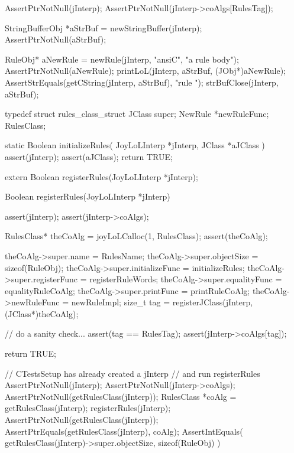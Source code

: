 \startCTest
  AssertPtrNotNull(jInterp);
  AssertPtrNotNull(jInterp->coAlgs[RulesTag]);

  StringBufferObj *aStrBuf = newStringBuffer(jInterp);
  AssertPtrNotNull(aStrBuf);
  
  RuleObj* aNewRule =
    newRule(jInterp, "ansiC", "a rule body");
  AssertPtrNotNull(aNewRule);
  printLoL(jInterp, aStrBuf, (JObj*)aNewRule);
  AssertStrEquals(getCString(jInterp, aStrBuf), "rule ");
  strBufClose(jInterp, aStrBuf);
\stopCTest
\stopTestCase
\stopTestSuite

\startTestSuite[registerRules]

\startCHeader
typedef struct rules_class_struct {
  JClass       super;
  NewRule      *newRuleFunc;
} RulesClass;

\stopCHeader

\startCCode
static Boolean initializeRules(
  JoyLoLInterp *jInterp,
  JClass   *aJClass
) {
  assert(jInterp);
  assert(aJClass);
  return TRUE;
}
\stopCCode

\startCHeader
extern Boolean registerRules(JoyLoLInterp *jInterp);
\stopCHeader
{}

\startCCode
Boolean registerRules(JoyLoLInterp *jInterp) {
  assert(jInterp);
  assert(jInterp->coAlgs);
  
  RulesClass* theCoAlg
    = joyLoLCalloc(1, RulesClass);
  assert(theCoAlg);
  
  theCoAlg->super.name           = RulesName;
  theCoAlg->super.objectSize     = sizeof(RuleObj);
  theCoAlg->super.initializeFunc = initializeRules;
  theCoAlg->super.registerFunc   = registerRuleWords;
  theCoAlg->super.equalityFunc   = equalityRuleCoAlg;
  theCoAlg->super.printFunc      = printRuleCoAlg;
  theCoAlg->newRuleFunc = newRuleImpl;
  size_t tag =
    registerJClass(jInterp, (JClass*)theCoAlg);
  
  // do a sanity check...
  assert(tag == RulesTag);
  assert(jInterp->coAlgs[tag]);
   
  return TRUE;
}
\stopCCode


\startCTest
  // CTestsSetup has already created a jInterp
  // and run registerRules
  AssertPtrNotNull(jInterp);
  AssertPtrNotNull(jInterp->coAlgs);
  AssertPtrNotNull(getRulesClass(jInterp));
  RulesClass *coAlg = getRulesClass(jInterp);
  registerRules(jInterp);
  AssertPtrNotNull(getRulesClass(jInterp));
  AssertPtrEquals(getRulesClass(jInterp), coAlg);
  AssertIntEquals(
    getRulesClass(jInterp)->super.objectSize,
    sizeof(RuleObj)
  )
\stopCTest
\stopTestCase
\stopTestSuite
